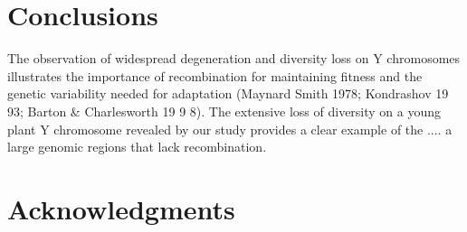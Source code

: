 \documentclass[9pt,twocolumn,twoside]{gsajnl}
\begin{document}

\section*{Conclusions}



The observation of widespread degeneration and diversity loss on Y chromosomes illustrates the importance of recombination for maintaining fitness and the genetic variability needed for adaptation (Maynard Smith 1978; Kondrashov 19 93; Barton & Charlesworth 19 9 8). The extensive loss of diversity on a young plant Y chromosome revealed by our study provides a clear example of the .... a large genomic regions that lack recombination.

\section*{Acknowledgments}



\end{document}
